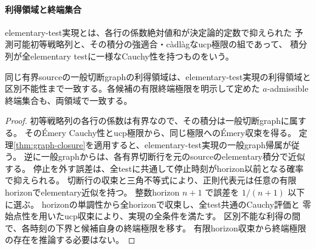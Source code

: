 \paragraph{利得領域と終端集合}
elementary-test実現とは、各行の係数絶対値和が決定論的定数で抑えられた
予測可能初等戦略列と、その積分の強適合・càdlàgなucp極限の組であって、
積分列が全elementary testに一様なCauchy性を持つものをいう。
\begin{proposition}[利得領域と終端集合の同定]
同じ有界sourceの一般切断graphの利得領域は、elementary-test実現の利得領域と
区別不能性まで一致する。各候補の有限終端極限を明示して定めた
$a$-admissible終端集合も、両領域で一致する。
\end{proposition}
\begin{proof}
初等戦略列の各行の係数は有界なので、その積分は一般切断graphに属する。
そのÉmery Cauchy性とucp極限から、同じ極限へのÉmery収束を得る。
定理\ref{thm:graph-closure}を適用すると、elementary-test実現の一般graph帰属が従う。
逆に一般graphからは、各有界切断行を元のsourceのelementary積分で近似する。
停止を外す誤差は、全testに共通して停止時刻がhorizon以前となる確率で抑えられる。
切断行の収束と三角不等式により、正則代表元は任意の有限horizonでelementary近似を持つ。
整数horizon $n+1$ で誤差を $1/(n+1)$ 以下に選ぶ。
horizonの単調性から全horizonで収束し、全test共通のCauchy評価と
零始点性を用いたucp収束により、実現の全条件を満たす。
区別不能な利得の間で、各時刻の下界と候補自身の終端極限を移す。
有限horizon収束から終端極限の存在を推論する必要はない。
\end{proof}
